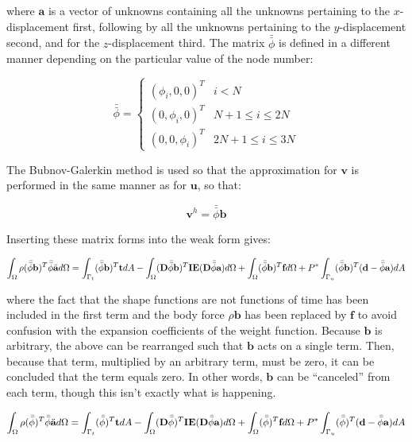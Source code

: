 \documentclass[10pt]{article}
\begin{document}
where \(\textbf{a}\) is a vector of unknowns containing all the unknowns pertaining to the \(x\)-displacement first, following by all the unknowns pertaining to the \(y\)-displacement second, and for the \(z\)-displacement third. The matrix \(\bar{\bar{\phi}}\) is defined in a different manner depending on the particular value of the node number:

\begin{equation}
\bar{\bar{\phi}}=
\begin{cases}(\phi_i, 0, 0)^T & i < N\\(0, \phi_i, 0)^T & N+1\leq i\leq 2N \\ (0, 0, \phi_i)^T & 2N+1\leq i\leq 3N
\end{cases}
\end{equation}

The Bubnov-Galerkin method is used so that the approximation for \(\textbf{v}\) is performed in the same manner as for \(\textbf{u}\), so that:

\begin{equation}
\textbf{v}^h=\bar{\bar{\phi}}\textbf{b}
\end{equation}

Inserting these matrix forms into the weak form gives:

\begin{equation}
\int_{\Omega}\rho(\bar{\bar{\phi}}\textbf{b})^T\bar{\bar{\phi}}\ddot{\textbf{a}}d\Omega=\int_{\Gamma_t}(\bar{\bar{\phi}}\textbf{b})^T\textbf{t}dA- \int_{\Omega}(\textbf{D}\bar{\bar{\phi}}\textbf{b})^T\textbf{IE}(\textbf{D}\bar{\bar{\phi}}\textbf{a})d\Omega +\int_{\Omega}(\bar{\bar{\phi}}\textbf{b})^T\textbf{f}d\Omega+P^{*}\int_{\Gamma_u}(\bar{\bar{\phi}}\textbf{b})^T(\textbf{d}-\bar{\bar{\phi}}\textbf{a})dA\\
\end{equation}

where the fact that the shape functions are not functions of time has been included in the first term and the body force \(\rho\textbf{b}\) has been replaced by \(\textbf{f}\) to avoid confusion with the expansion coefficients of the weight function. Because \(\textbf{b}\) is arbitrary, the above can be rearranged such that \(\textbf{b}\) acts on a single term. Then, because that term, multiplied by an arbitrary term, must be zero, it can be concluded that the term equals zero. In other words, \(\textbf{b}\) can be ``canceled'' from each term, though this isn't exactly what is happening.

\begin{equation}
\int_{\Omega}\rho(\bar{\bar{\phi}})^T\bar{\bar{\phi}}\ddot{\textbf{a}}d\Omega=\int_{\Gamma_t}(\bar{\bar{\phi}})^T\textbf{t}dA- \int_{\Omega}(\textbf{D}\bar{\bar{\phi}})^T\textbf{IE}(\textbf{D}\bar{\bar{\phi}}\textbf{a})d\Omega +\int_{\Omega}(\bar{\bar{\phi}})^T\textbf{f}d\Omega+P^{*}\int_{\Gamma_u}(\bar{\bar{\phi}})^T(\textbf{d}-\bar{\bar{\phi}}\textbf{a})dA\\
\end{equation}
\end{document}
